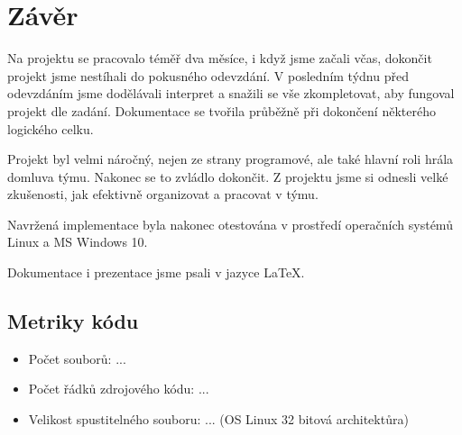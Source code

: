 \documentclass[a4paper, 11pt, titlepage]{article}
\begin{document}
\section{Závěr}
Na projektu se pracovalo téměř dva měsíce, i když jsme začali včas, dokončit projekt jsme nestíhali do pokusného odevzdání. V posledním týdnu před odevzdáním jsme dodělávali interpret a snažili se vše zkompletovat, aby fungoval projekt dle zadání. Dokumentace se tvořila průběžně při dokončení některého logického celku. 

Projekt byl velmi náročný, nejen ze strany programové, ale také hlavní roli hrála domluva týmu. Nakonec se to zvládlo dokončit. Z projektu jsme si odnesli velké zkušenosti, jak efektivně organizovat a pracovat v týmu.

Navržená implementace byla nakonec otestována v prostředí operačních systémů Linux a MS Windows 10.

Dokumentace i prezentace jsme psali v jazyce \LaTeX. 

\subsection{Metriky kódu}
\begin{itemize}
	\item Počet souborů: ...
	\item Počet řádků zdrojového kódu: ...
	\item Velikost spustitelného souboru: ... (OS Linux 32 bitová architektůra)
\end{itemize}  

\nocite{Ahoc2007}

\end{document}
